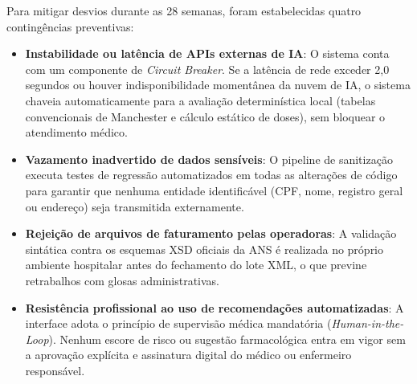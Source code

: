Para mitigar desvios durante as 28 semanas, foram estabelecidas quatro contingências preventivas:
\begin{itemize}[leftmargin=*]
    \item \textbf{Instabilidade ou latência de APIs externas de IA}: O sistema conta com um componente de \textit{Circuit Breaker}. Se a latência de rede exceder 2,0 segundos ou houver indisponibilidade momentânea da nuvem de IA, o sistema chaveia automaticamente para a avaliação determinística local (tabelas convencionais de Manchester e cálculo estático de doses), sem bloquear o atendimento médico.
    \item \textbf{Vazamento inadvertido de dados sensíveis}: O pipeline de sanitização executa testes de regressão automatizados em todas as alterações de código para garantir que nenhuma entidade identificável (CPF, nome, registro geral ou endereço) seja transmitida externamente.
    \item \textbf{Rejeição de arquivos de faturamento pelas operadoras}: A validação sintática contra os esquemas XSD oficiais da ANS é realizada no próprio ambiente hospitalar antes do fechamento do lote XML, o que previne retrabalhos com glosas administrativas.
    \item \textbf{Resistência profissional ao uso de recomendações automatizadas}: A interface adota o princípio de supervisão médica mandatória (\textit{Human-in-the-Loop}). Nenhum escore de risco ou sugestão farmacológica entra em vigor sem a aprovação explícita e assinatura digital do médico ou enfermeiro responsável.
\end{itemize}

